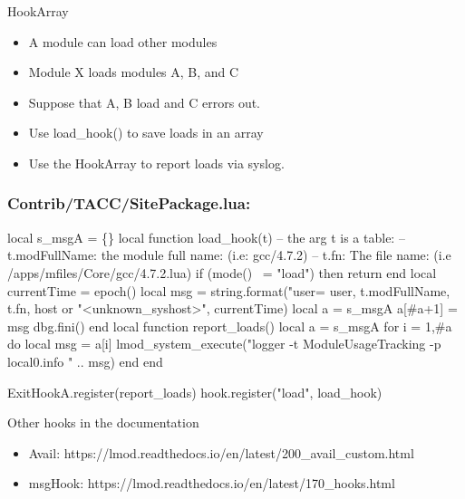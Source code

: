\documentclass{beamer}
\begin{document}
\begin{frame}{HookArray}
  \begin{itemize}
    \item A module can load other modules
    \item Module X loads modules A, B, and C
    \item Suppose that A, B load and C errors out.
    \item Use load\_hook() to save loads in an array
    \item Use the HookArray to report loads via syslog.
  \end{itemize}
\end{frame}

\begin{frame}[fragile]
  \frametitle{Contrib/TACC/SitePackage.lua: }
    {\tiny
\begin{semiverbatim}
local s\_msgA = \{\}
local function load_hook(t)
   -- the arg t is a table:
   --     t.modFullName:  the module full name: (i.e: gcc/4.7.2)
   --     t.fn:           The file name: (i.e /apps/mfiles/Core/gcc/4.7.2.lua)
   if (mode() ~= "load") then return end
   local currentTime = epoch()
   local msg         = string.format("user=%
                                     user, t.modFullName, t.fn, 
                                     host or "<unknown_syshost>", currentTime)
   local a           = s\_msgA
   a[#a+1]           = msg
   dbg.fini()
end
local function report_loads()
   local a = s\_msgA
   for i = 1,#a do
      local msg = a[i]
      lmod_system_execute("logger -t ModuleUsageTracking -p local0.info " .. msg)
   end
end

ExitHookA.register(report_loads)
hook.register("load",           load_hook)
\end{semiverbatim}
    }
\end{frame}


\begin{frame}{Other hooks in the documentation}
  \begin{itemize}
    \item Avail: https://lmod.readthedocs.io/en/latest/200\_avail\_custom.html
    \item msgHook: https://lmod.readthedocs.io/en/latest/170\_hooks.html
  \end{itemize}
\end{frame}
\end{document}
